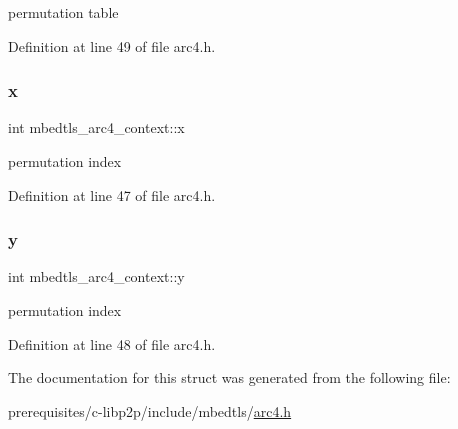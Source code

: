 permutation table 

Definition at line 49 of file arc4.\+h.

\mbox{\label{structmbedtls__arc4__context_a35ada04bd0e0ebb3c91fe0a7be91d62c}} 
\subsubsection{\texorpdfstring{x}{x}}
{\footnotesize\ttfamily int mbedtls\+\_\+arc4\+\_\+context\+::x}

permutation index 

Definition at line 47 of file arc4.\+h.

\mbox{\label{structmbedtls__arc4__context_a53d6a6d70c2b3ef5cd4467ae32e21429}} 
\subsubsection{\texorpdfstring{y}{y}}
{\footnotesize\ttfamily int mbedtls\+\_\+arc4\+\_\+context\+::y}

permutation index 

Definition at line 48 of file arc4.\+h.



The documentation for this struct was generated from the following file\+:\begin{DoxyCompactItemize}
\item 
prerequisites/c-\/libp2p/include/mbedtls/\mbox{\hyperlink{arc4_8h}{arc4.\+h}}\end{DoxyCompactItemize}
